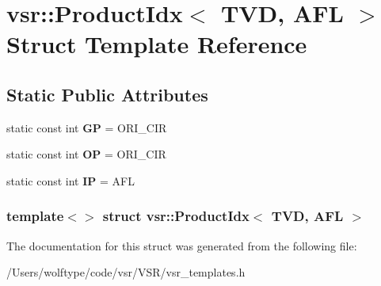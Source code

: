 \hypertarget{structvsr_1_1_product_idx_3_01_t_v_d_00_01_a_f_l_01_4}{\section{vsr\-:\-:Product\-Idx$<$ T\-V\-D, A\-F\-L $>$ Struct Template Reference}
\label{structvsr_1_1_product_idx_3_01_t_v_d_00_01_a_f_l_01_4}
}
\subsection*{Static Public Attributes}
\begin{DoxyCompactItemize}
\item 
\hypertarget{structvsr_1_1_product_idx_3_01_t_v_d_00_01_a_f_l_01_4_a0589a6e7d1a9f965d0151fe8fe695c4f}{static const int {\bfseries G\-P} = O\-R\-I\-\_\-\-C\-I\-R}\label{structvsr_1_1_product_idx_3_01_t_v_d_00_01_a_f_l_01_4_a0589a6e7d1a9f965d0151fe8fe695c4f}

\item 
\hypertarget{structvsr_1_1_product_idx_3_01_t_v_d_00_01_a_f_l_01_4_a8253c41b7b30686a11bd607766630833}{static const int {\bfseries O\-P} = O\-R\-I\-\_\-\-C\-I\-R}\label{structvsr_1_1_product_idx_3_01_t_v_d_00_01_a_f_l_01_4_a8253c41b7b30686a11bd607766630833}

\item 
\hypertarget{structvsr_1_1_product_idx_3_01_t_v_d_00_01_a_f_l_01_4_aa1aa8e4d8ea6d1ee21579578c280b3f1}{static const int {\bfseries I\-P} = A\-F\-L}\label{structvsr_1_1_product_idx_3_01_t_v_d_00_01_a_f_l_01_4_aa1aa8e4d8ea6d1ee21579578c280b3f1}

\end{DoxyCompactItemize}
\subsubsection*{template$<$$>$ struct vsr\-::\-Product\-Idx$<$ T\-V\-D, A\-F\-L $>$}



The documentation for this struct was generated from the following file\-:\begin{DoxyCompactItemize}
\item 
/\-Users/wolftype/code/vsr/\-V\-S\-R/vsr\-\_\-templates.\-h\end{DoxyCompactItemize}
